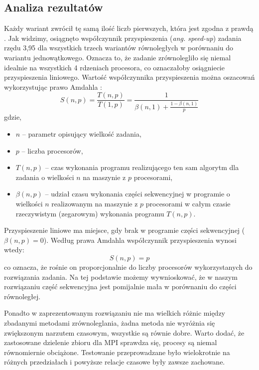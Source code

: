 \documentclass[12pt, twoside, hidelinks, a4paper]{article}
\begin{document}
\subsection{Analiza rezultatów}
Każdy wariant zwrócił tę samą ilość liczb pierwszych, która jest zgodna z prawdą \cite{c3}. Jak widzimy, osiągnęto współczynnik przyspieszenia (\textit{ang. speed-up}) zadania rzędu 3,95 dla wszystkich trzech wariantów równoległych w porównaniu do wariantu jednowątkowego. Oznacza to, że zadanie zrównolegliło się niemal idealnie na wszystkich 4 rdzeniach procesora, co oznaczałoby osiągniecie przyspieszenia liniowego. Wartość współczynnika przyspieszenia można oszacowań wykorzystując prawo Amdahla \cite{c4}:
\begin{equation}
S(n,p)=\frac{T(n,p)}{T(1,p)}=\frac{1}{\beta(n,1)+\frac{1-\beta(n,1)}{p}}
\end{equation}
gdzie,
\begin{itemize}
\item $n$ – parametr opisujący wielkość zadania,
\item $p$ – liczba procesorów,
\item $T(n, p)$ – czas wykonania programu realizującego ten sam algorytm dla zadania o wielkości $n$ na maszynie z $p$ procesorami,
\item $\beta(n, p)$ – udział czasu wykonania części sekwencyjnej w programie o wielkości $n$ realizowanym na maszynie z $p$ procesorami w całym czasie rzeczywistym (zegarowym) wykonania programu $T(n, p)$.
\end{itemize}
Przyspieszenie liniowe ma miejsce, gdy brak w programie części sekwencyjnej (\textit{$\beta(n, p) = 0$}). Według prawa Amdahla współczynnik przyspieszenia wynosi wtedy:
\begin{equation}
S(n, p) = p
\end{equation}
co oznacza, że rośnie on proporcjonalnie do liczby procesorów wykorzystanych do rozwiązania zadania. Na tej podstawie możemy wywnioskować, że w naszym rozwiązaniu część sekwencyjna jest pomijalnie mała w porównaniu do części równoległej.

Ponadto w zaprezentowanym rozwiązaniu nie ma wielkich różnic między zbadanymi metodami zrównoleglania, żadna metoda nie wyróżnia się zwiększonym narzutem czasowym, wszystkie są równie dobre. Warto dodać, że zastosowane dzielenie zbioru dla MPI sprawdza się, procesy są niemal równomiernie obciążone. Testowanie przeprowadzane było wielokrotnie na różnych przedziałach i powyższe relacje czasowe były zawsze zachowane.

\printbibliography
\end{document}
